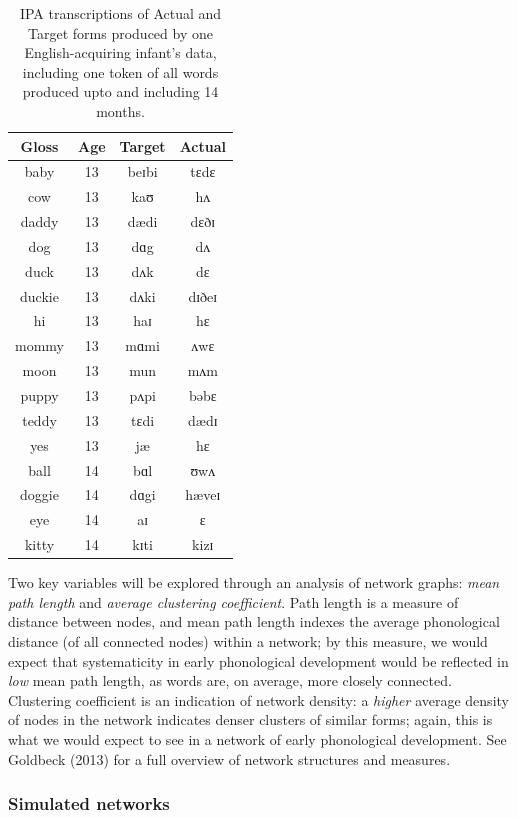 \documentclass[
  man]{apa6}
\begin{document}
\begin{longtable}[t]{cccc}
\caption{\label{tab:Table-IPA-egs}IPA transcriptions of Actual and Target forms produced by one English-acquiring infant's data, including one token of all words produced upto and including 14 months.}\\
\toprule
Gloss & Age & Target & Actual\\
\midrule
baby & 13 & beɪbi & tɛdɛ\\
cow & 13 & kaʊ & hʌ\\
daddy & 13 & dædi & dɛðɪ\\
dog & 13 & dɑg & dʌ\\
duck & 13 & dʌk & dɛ\\
\addlinespace
duckie & 13 & dʌki & dɪðeɪ\\
hi & 13 & haɪ & hɛ\\
mommy & 13 & mɑmi & ʌwɛ\\
moon & 13 & mun & mʌm\\
puppy & 13 & pʌpi & bəbɛ\\
\addlinespace
teddy & 13 & tɛdi & dædɪ\\
yes & 13 & jæ & hɛ\\
ball & 14 & bɑl & ʊwʌ\\
doggie & 14 & dɑgi & hæveɪ\\
eye & 14 & aɪ & ɛ\\
\addlinespace
kitty & 14 & kɪti & kizɪ\\
\bottomrule
\end{longtable}

Two key variables will be explored through an analysis of network graphs: \emph{mean path length} and \emph{average clustering coefficient}. Path length is a measure of distance between nodes, and mean path length indexes the average phonological distance (of all connected nodes) within a network; by this measure, we would expect that systematicity in early phonological development would be reflected in \emph{low} mean path length, as words are, on average, more closely connected. Clustering coefficient is an indication of network density: a \emph{higher} average density of nodes in the network indicates denser clusters of similar forms; again, this is what we would expect to see in a network of early phonological development. See Goldbeck (2013) for a full overview of network structures and measures.

\subsubsection{Simulated networks}\label{simulated-networks}
\end{document}
